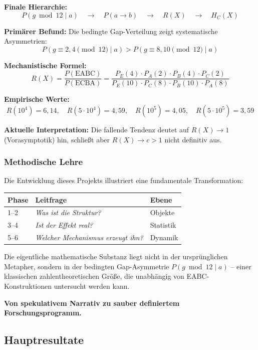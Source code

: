 \documentclass[11pt,a4paper]{article}
\begin{document}
\textbf{Finale Hierarchie:}
\[
\boxed{P(g \bmod 12 \mid a)} \quad \longrightarrow \quad P(a \to b) \quad \longrightarrow \quad R(X) \quad \longrightarrow \quad H_C(X)
\]

\textbf{Primärer Befund:} Die bedingte Gap-Verteilung zeigt systematische Asymmetrien:
\[
P(g \equiv 2, 4 \pmod{12} \mid a) > P(g \equiv 8, 10 \pmod{12} \mid a)
\]

\textbf{Mechanistische Formel:}
\[
R(X) = \frac{P(\text{EABC})}{P(\text{ECBA})} = \frac{P_E(4) \cdot P_A(2) \cdot P_B(4) \cdot P_C(2)}{P_E(10) \cdot P_C(8) \cdot P_B(10) \cdot P_A(8)}
\]

\textbf{Empirische Werte:}
\[
R(10^4) = 6{,}14, \quad R(5 \cdot 10^4) = 4{,}59, \quad R(10^5) = 4{,}05, \quad R(5 \cdot 10^5) = 3{,}59
\]

\textbf{Aktuelle Interpretation:} Die fallende Tendenz deutet auf $R(X) \to 1$ (Vorasymptotik) hin, schließt aber $R(X) \to c > 1$ nicht definitiv aus.

\subsubsection{Methodische Lehre}

Die Entwicklung dieses Projekts illustriert eine fundamentale Transformation:

\begin{center}
\begin{tabular}{lll}
\textbf{Phase} & \textbf{Leitfrage} & \textbf{Ebene} \\ \hline
1--2 & \textit{Was ist die Struktur?} & Objekte \\
3--4 & \textit{Ist der Effekt real?} & Statistik \\
5--6 & \textit{Welcher Mechanismus erzeugt ihn?} & Dynamik
\end{tabular}
\end{center}

Die eigentliche mathematische Substanz liegt nicht in der ursprünglichen Metapher, sondern in der bedingten Gap-Asymmetrie $P(g \bmod 12 \mid a)$ -- einer klassischen zahlentheoretischen Größe, die unabhängig von EABC-Konstruktionen untersucht werden kann.

\textbf{Von spekulativem Narrativ zu sauber definiertem Forschungsprogramm.}

\subsection{Hauptresultate}
\end{document}
